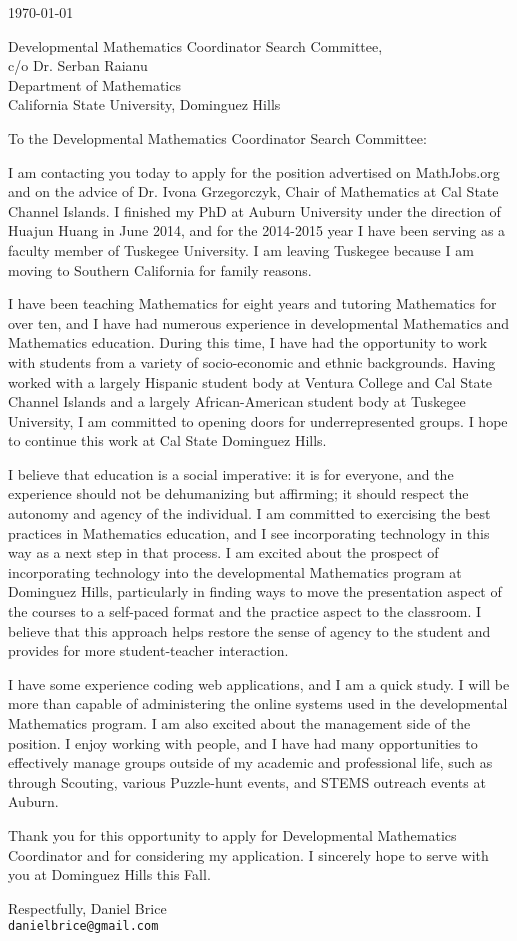 \documentclass[11pt]{article}
\begin{document}

\today

Developmental Mathematics Coordinator Search Committee,\\
c/o Dr. Serban Raianu\\
Department of Mathematics\\
California State University, Dominguez Hills

To the Developmental Mathematics Coordinator Search Committee:

I am contacting you today to apply for the position advertised on MathJobs.org
and on the advice of Dr. Ivona Grzegorczyk, Chair of Mathematics at Cal State Channel Islands.
I finished my PhD at Auburn University under the direction of Huajun Huang in June 2014,
and for the 2014-2015 year I have been serving as a faculty member of Tuskegee University.
I am leaving Tuskegee because I am moving to Southern California for family reasons.

I have been teaching Mathematics for eight years and tutoring Mathematics for over ten,
and I have had numerous experience in developmental Mathematics and Mathematics education.
During this time, I have had the opportunity to work with students from a variety of
socio-economic and ethnic backgrounds.
Having worked with a largely Hispanic student body at Ventura College and Cal State Channel
Islands and a largely African-American student body at Tuskegee University,
I am committed to opening doors for underrepresented groups.
I hope to continue this work at Cal State Dominguez Hills.

I believe that education is a social imperative:
it is for everyone, and the experience should not be dehumanizing but affirming;
it should respect the autonomy and agency of the individual.
I am committed to exercising the best practices in Mathematics education,
and I see incorporating technology in this way as a next step in that process.
I am excited about the prospect of incorporating technology into the developmental Mathematics
program at Dominguez Hills,
particularly in finding ways to move the presentation aspect of the courses to a self-paced
format and the practice aspect to the classroom.
I believe that this approach helps restore the sense of agency to the student
and provides for more student-teacher interaction.

I have some experience coding web applications, and I am a quick study.
I will be more than capable of administering the online systems used in the developmental
Mathematics program.
I am also excited about the management side of the position.
I enjoy working with people, and I have had many opportunities to effectively manage groups
outside of my academic and professional life,
such as through Scouting, various Puzzle-hunt events, and STEMS outreach events at Auburn.

Thank you for this opportunity to apply for Developmental Mathematics Coordinator and for
considering my application. I sincerely hope to serve with you at Dominguez Hills this Fall.

Respectfully,
\vfill
Daniel Brice\\
\texttt{danielbrice@gmail.com}

\label{page:last}
\end{document}
